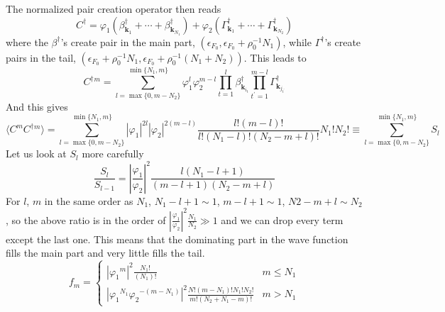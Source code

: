 \documentclass[aps,prb,preprint,groupedaddress,amsmath]{revtex4}
\newcommand{\vk}{\ensuremath{\mathbf{k}}}
\newcommand{\dg}{\ensuremath{\dagger}}
\begin{document}
The normalized pair creation operator then reads
\begin{equation}
C^\dg=\varphi_1(\beta^\dg_{\vk_1}+\cdots+\beta^\dg_{\vk_{N_1}})+\varphi_2(\Gamma^\dg_{\vk_{1}}+\cdots+\Gamma^\dg_{\vk_{N_2}})
\end{equation}
where the $\beta^\dg$'s create pair in the main part, $(\epsilon_{F_0},\epsilon_{F_0}+\rho_0^{-1}N_1)$, while $\Gamma^\dg$'s create pairs in the tail, $(\epsilon_{F_0}+\rho_0^{-1}N_1,\epsilon_{F_0}+\rho_0^{-1}(N_1+N_2))$.
This leads to\begin{equation}
C^\dg{}^m=\sum_{l=\max\{0,m-N_2\}}^{\min\{N_1,m\}}\varphi_1^l\varphi_2^{m-l}\prod_{t=1}^{l}\beta^\dg_{\vk_{i_t}}\prod_{t^\prime=1}^{m-l}\Gamma^\dg_{\vk_{j_{t^\prime}}}
\end{equation}
And this gives
\begin{equation}
\langle{}C^mC^\dg{}^m\rangle=\sum_{l=\max\{0,m-N_2\}}^{\min\{N_1,m\}}|\varphi_1|^{2l}|\varphi_2|^{2(m-l)}
\frac{l!(m-l)!}{l!(N_1-l)!(N_2-m+l)!}N_1!N_2!\equiv\sum_{l=\max\{0,m-N_2\}}^{\min\{N_1,m\}}S_l
\end{equation}
Let us look at $S_l$ more carefully
\begin{equation}
\frac{S_l}{S_{l-1}}=\left|\frac{\varphi_1}{\varphi_2}\right|^2\frac{l(N_1-l+1)}{(m-l+1)(N_2-m+l)}
\end{equation}
For $l$, $m$ in the same order as $N_1$, $N_1-l+1\sim1$, $m-l+1\sim1$, $N2-m+l\sim{N_2}$, so the above ratio is in the order of $\left|\frac{\varphi_1}{\varphi_2}\right|^2\frac{N_1}{N_2}\gg1$ and we can drop every term except the last one. This means that the dominating part in the wave function fills the main part and very little fills the tail.  
\begin{equation}
f_m=
\begin{cases}
\left|{\varphi_1}^{m}\right|^2\frac{N_1!}{(N_1)!}&m\leq{}N_1\\
\left|{\varphi_1}^{N_1}{\varphi_2}^{-(m-N_1)}\right|^2\frac{N!(m-N_1)!N_1!N_2!}{m!(N_2+N_1-m)!}&m>N_1
\end{cases}
\end{equation}
\end{document}
